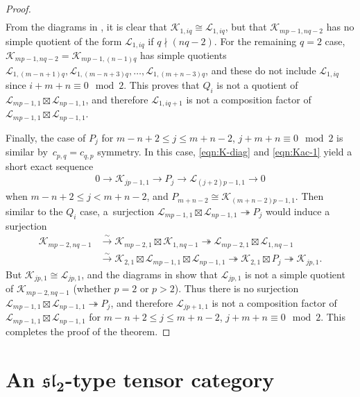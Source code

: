 \documentclass[pdftex]{sigma}
\numberwithin{equation}{section}
\theoremstyle{definition}
\begin{document}
\begin{proof}
\begin{align*}
\end{align*}
From the diagrams in \cite[Section 2.3]{MS-cpq-Vir}, it is clear that $\mathcal{K}_{1,iq}\cong\mathcal{L}_{1,iq}$, but that $\mathcal{K}_{mp-1,nq-2}$ has no simple quotient of the form $\mathcal{L}_{1,iq}$ if $q\nmid (nq-2)$. For the remaining $q=2$ case, $\mathcal{K}_{mp-1,nq-2}=\mathcal{K}_{mp-1,(n-1)q}$ has simple quotients
$
\mathcal{L}_{1,(m-n+1)q},\mathcal{L}_{1,(m-n+3)q},\ldots,\mathcal{L}_{1,(m+n-3)q}$,
and these do not include $\mathcal{L}_{1,iq}$ since $i+m+n\equiv 0 \mod 2$. This proves that $Q_i$ is not a quotient of $\mathcal{L}_{mp-1,1}\boxtimes\mathcal{L}_{np-1,1}$, and therefore $\mathcal{L}_{1,iq+1}$ is not a composition factor of $\mathcal{L}_{mp-1,1}\boxtimes\mathcal{L}_{np-1,1}$.

Finally, the case of $P_j$ for $m-n+2\leq j\leq m+n-2$, $j+m+n\equiv 0 \mod 2$ is similar by~${c_{p,q}=c_{q,p}}$ symmetry. In this case, \eqref{eqn:K-diag} and \eqref{eqn:Kac-1} yield a short exact sequence
\begin{gather*}
0\longrightarrow\mathcal{K}_{jp-1,1}\longrightarrow P_j\longrightarrow\mathcal{L}_{(j+2)p-1,1}\longrightarrow 0
\end{gather*}
when $m-n+2\leq j < m+n-2$, and $P_{m+n-2}\cong\mathcal{K}_{(m+n-2)p-1,1}$. Then similar to the $Q_i$ case, a~surjection $\mathcal{L}_{mp-1,1}\boxtimes\mathcal{L}_{np-1,1}\twoheadrightarrow P_j$ would induce a surjection
\begin{align*}
\mathcal{K}_{mp-2,nq-1} &\xrightarrow{\sim}\mathcal{K}_{mp-2,1}\boxtimes\mathcal{K}_{1,nq-1} \twoheadrightarrow\mathcal{L}_{mp-2,1}\boxtimes\mathcal{L}_{1,nq-1} \nonumber\\
& \xrightarrow{\sim}\mathcal{K}_{2,1}\boxtimes\mathcal{L}_{mp-1,1}\boxtimes\mathcal{L}_{np-1,1}\twoheadrightarrow\mathcal{K}_{2,1}\boxtimes P_j\twoheadrightarrow\mathcal{K}_{jp,1}.
\end{align*}
But $\mathcal{K}_{jp,1}\cong\mathcal{L}_{jp,1}$, and the diagrams in \cite[Section 2.3]{MS-cpq-Vir} show that $\mathcal{L}_{jp,1}$ is not a simple quotient of $\mathcal{K}_{mp-2,nq-1}$ (whether $p=2$ or $p>2$). Thus there is no surjection $\mathcal{L}_{mp-1,1}\boxtimes\mathcal{L}_{np-1,1}\twoheadrightarrow P_j$, and therefore $\mathcal{L}_{jp+1,1}$ is not a composition factor of $\mathcal{L}_{mp-1,1}\boxtimes\mathcal{L}_{np-1,1}$ for $m-n+2\leq j\leq m+n-2$, $j+m+n\equiv 0 \mod 2$. This completes the proof of the theorem.
\end{proof}


\section[An sl\_2-type tensor category]{An $\boldsymbol{\mathfrak{sl}_2}$-type tensor category}\label{sec:sl2-type-cat}
\end{document}
